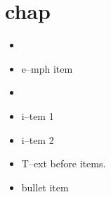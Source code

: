 \documentclass{book}
\renewcommand{\_}{\GNUTexinfounderscore\discretionary{}{}{}}
\begin{document}
\label{anchor:Top}%
\chapter{{chap}}
\label{anchor:chapter}%

\begin{itemize}[label=-]
\item {}%
\item e--mph item
\end{itemize}

\begin{itemize}[label=\textbullet{}]
\item {}%
\item i--tem 1
\item {}%
i--tem 2
\end{itemize}

\begin{itemize}
\item T--ext before items.
%
\item bullet item
\end{itemize}
\end{document}
